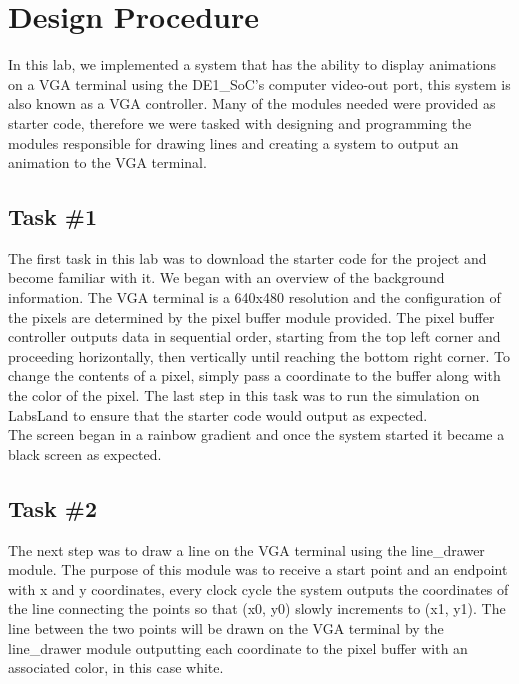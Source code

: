 \documentclass[11pt, titlepage]{article}
\author{Donovan Clay (ID: 2276005), Cameron Jennings (ID: 2029631)}
\title{\assignmentname}
\date{\parbox{\linewidth}{\centering
\experimentDate
  \endgraf\bigskip
  \className\
}}
\begin{document}
	\maketitle
 
    \setcounter{tocdepth}{2}
    \begin{center}
        \tableofcontents\label{beginning}
    \end{center}
    \newpage
    
    \section{Design Procedure}
        In this lab, we implemented a system that has the ability to display animations on a VGA terminal using the DE1\_SoC's computer video-out port, this system is also known as a VGA controller. Many of the modules needed were provided as starter code, therefore we were tasked with designing and programming the modules responsible for drawing lines and creating a system to output an animation to the VGA terminal.
        
        \subsection{Task \#1}
            The first task in this lab was to download the starter code for the project and become familiar with it. We began with an overview of the background information. The VGA terminal is a 640x480 resolution and the configuration of the pixels are determined by the pixel buffer module provided. The pixel buffer controller outputs data in sequential order, starting from the top left corner and proceeding horizontally, then vertically until reaching the bottom right corner. To change the contents of a pixel, simply pass a coordinate to the buffer along with the color of the pixel. The last step in this task was to run the simulation on LabsLand to ensure that the starter code would output as expected. \\

            The screen began in a rainbow gradient and once the system started it became a black screen as expected.
        \subsection{Task \#2}
            The next step was to draw a line on the VGA terminal using the line\_drawer module. The purpose of this module was to receive a start point and an endpoint with x and y coordinates, every clock cycle the system outputs the coordinates of the line connecting the points so that (x0, y0) slowly increments to (x1, y1). The line between the two points will be drawn on the VGA terminal by the line\_drawer module outputting each coordinate to the pixel buffer with an associated color, in this case white. 
\end{document}
